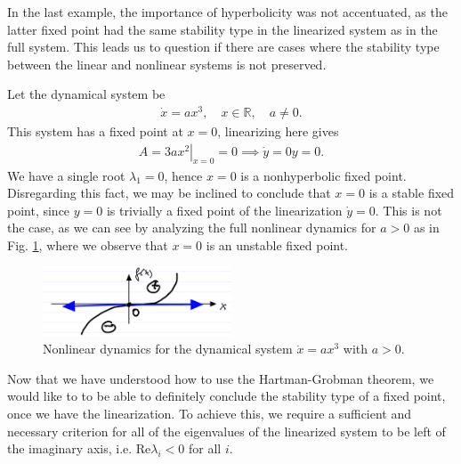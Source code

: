 In the last example, the importance of hyperbolicity was not accentuated, as the latter fixed point had the same stability type in the linearized system as in the full system. This leads us to question if there are cases where the stability type between the linear and nonlinear systems is not preserved.

\begin{ex}
	Let the dynamical system be
	\begin{align}
		\dot{x} = ax^3,\quad x\in\mathbb{R},\quad a \neq 0.
	\end{align}
	This system has a fixed point at $x=0$, linearizing here gives
	\begin{align}
		A = \left. 3ax^2 \right|_{x=0} = 0 \implies \dot{y}= 0y = 0.
	\end{align}
	We have a single root $\lambda_1 = 0$, hence $x=0$ is a nonhyperbolic fixed point. Disregarding this fact, we may be inclined to conclude that $x=0$ is a stable fixed point, since $y=0$ is trivially a fixed point of the linearization $\dot{y}=0$. This is not the case, as we can see by analyzing the full nonlinear dynamics for $a>0$ as in Fig. \ref{fig:hyperbol_counter_ex}, where we observe that $x=0$ is an unstable fixed point.
\begin{figure}[h!]
	\centering
	\includegraphics[width=0.5\textwidth]{figures/ch2/19hyperbol_counter_ex.png}
	\caption{Nonlinear dynamics for the dynamical system $\dot{x}= ax^3$ with $a>0$.}
	\label{fig:hyperbol_counter_ex}
\end{figure}
\end{ex}

Now that we have understood how to use the Hartman-Grobman theorem, we would like to to be able to definitely conclude the stability type of a fixed point, once we have the linearization. To achieve this, we require a sufficient and necessary criterion for all of the eigenvalues of the linearized system to be left of the imaginary axis, i.e. $ \textrm{Re} \lambda_i < 0$ for all $i$.


